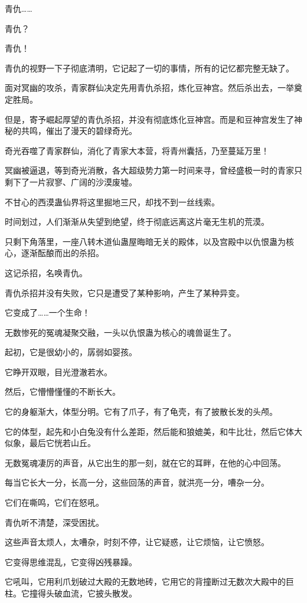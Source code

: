 \begin{this_body}
青仇……

青仇？

青仇！

青仇的视野一下子彻底清明，它记起了一切的事情，所有的记忆都完整无缺了。

面对冥幽的攻杀，青家群仙决定先用青仇杀招，炼化豆神宫。然后杀出去，一举奠定胜局。

但是，寄予崛起厚望的青仇杀招，并没有彻底炼化豆神宫。而是和豆神宫发生了神秘的共鸣，催出了漫天的碧绿奇光。

奇光吞噬了青家群仙，消化了青家大本营，将青州囊括，乃至蔓延万里！

冥幽被逼退，等到奇光消散，各大超级势力第一时间来寻，曾经盛极一时的青家只剩下了一片寂寥、广阔的沙漠废墟。

不甘心的西漠蛊仙界将这里掘地三尺，却找不到一丝线索。

时间划过，人们渐渐从失望到绝望，终于彻底远离这片毫无生机的荒漠。

只剩下角落里，一座八转木道仙蛊屋晦暗无关的殿体，以及宫殿中以仇恨蛊为核心，逐渐酝酿而出的杀招。

这记杀招，名唤青仇。

青仇杀招并没有失败，它只是遭受了某种影响，产生了某种异变。

它变成了……一个生命！

无数惨死的冤魂凝聚交融，一头以仇恨蛊为核心的魂兽诞生了。

起初，它是很幼小的，孱弱如婴孩。

它睁开双眼，目光澄澈若水。

然后，它懵懵懂懂的不断长大。

它的身躯渐大，体型分明。它有了爪子，有了龟壳，有了披散长发的头颅。

它的体型，起先和小白兔没有什么差距，然后能和狼媲美，和牛比壮，然后它体大似象，最后它恍若山丘。

无数冤魂凄厉的声音，从它出生的那一刻，就在它的耳畔，在他的心中回荡。

每当它长大一分，长高一分，这些回荡的声音，就洪亮一分，嘈杂一分。

它们在嘶鸣，它们在怒吼。

青仇听不清楚，深受困扰。

这些声音太烦人，太嘈杂，时刻不停，让它疑惑，让它烦恼，让它愤怒。

它变得思维混乱，它变得凶残暴躁。

它吼叫，它用利爪划破过大殿的无数地砖，它用它的背撞断过无数次大殿中的巨柱。它撞得头破血流，它披头散发。


\end{this_body}
